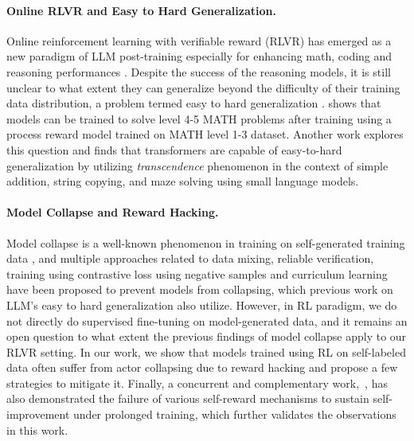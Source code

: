 \paragraph{Online RLVR and Easy to Hard Generalization.} Online reinforcement learning with verifiable reward (RLVR) \citep{lambert2025tulu3pushingfrontiers} has emerged as a new paradigm of LLM post-training especially for enhancing math, coding and reasoning performances \citep{openai2024openaio1card, deepseekai2025deepseekr1incentivizingreasoningcapability, kimiteam2025kimik15scalingreinforcement, lambert2025tulu3pushingfrontiers}. Despite the success of the reasoning models, it is still unclear to what extent they can generalize beyond the difficulty of their training data distribution, a problem termed easy to hard generalization \citep{sun2024easytohard}. \citep{sun2024easytohard} shows that models can be trained to solve level 4-5 MATH\citep{hendrycks2021measuring} problems after training using a process reward model trained on MATH level 1-3 dataset. Another work \citep{lee2025selfimprovingtransformersovercomeeasytohard} explores this question and finds that transformers are capable of easy-to-hard generalization by utilizing \textit{transcendence} phenomenon \citep{zhang2024transcendence} in the context of simple addition, string copying, and maze solving using small language models. 

\paragraph{Model Collapse and Reward Hacking.} Model collapse is a well-known phenomenon in training on self-generated training data \citep{alemohammad2024selfconsuming, DBLP:journals/nature/ShumailovSZPAG24, shumailov2024curserecursiontraininggenerated, bertrand2024on, briesch2025large}, and multiple approaches related to data mixing, reliable verification, training using contrastive loss using negative samples and curriculum learning have been proposed \citep{gerstgrasser2024is, feng2025beyond, briesch2025large, song2025mind, gillman2024selfcorrectingselfconsumingloopsgenerative, setlur2024rl} to prevent models from collapsing, which previous work on LLM's easy to hard generalization \citep{lee2025selfimprovingtransformersovercomeeasytohard} also utilize. 
However, in RL paradigm, we do not directly do supervised fine-tuning on model-generated data, and it remains an open question to what extent the previous findings of model collapse apply to our RLVR setting. In our work, we show that models trained using RL on self-labeled data often suffer from actor collapsing due to reward hacking \citep{amodei2016concreteproblemsaisafety, denison2024sycophancysubterfugeinvestigatingrewardtampering} and propose a few strategies to mitigate it. Finally, a concurrent and complementary work,~\citet{zhang2025freelunchrethinkinginternal}, has also demonstrated the failure of various self-reward mechanisms to sustain self-improvement under prolonged training, which further validates the observations in this work.


